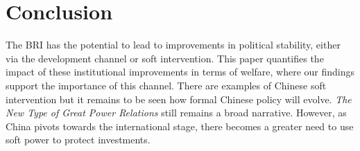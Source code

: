\section{Conclusion}

The BRI has the potential to lead to improvements in political stability, either via the development channel or soft intervention. This paper quantifies the impact of these institutional improvements in terms of welfare, where our findings support the importance of this channel. There are examples of Chinese soft intervention but it remains to be seen how formal Chinese policy will evolve. \textit{The New Type of Great Power Relations} still remains a broad narrative. However, as China pivots towards the international stage, there becomes a greater need to use soft power to protect investments. 